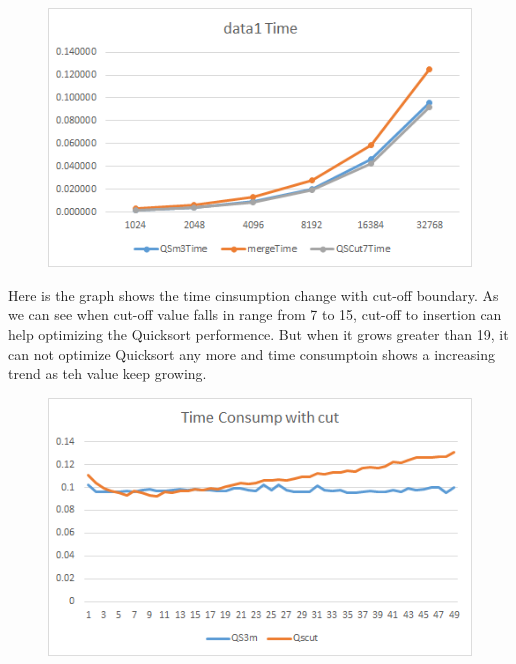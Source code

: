 \documentclass[conference]{IEEEtran}
\begin{document}
\begin{figure}[H]
    \centerline{\includegraphics[scale=0.65]{Pic/pic11.png}}
\end{figure}

Here is the graph shows the time cinsumption change with cut-off boundary. As we can see
when cut-off value falls in range from 7 to 15, cut-off to insertion can help optimizing 
the Quicksort performence. But when it grows greater than 19, it can not optimize Quicksort 
any more and time consumptoin shows a increasing trend as teh value keep growing.

\begin{figure}[H]
    \centerline{\includegraphics[scale=0.65]{Pic/pic12.png}}
\end{figure}
\end{document}
